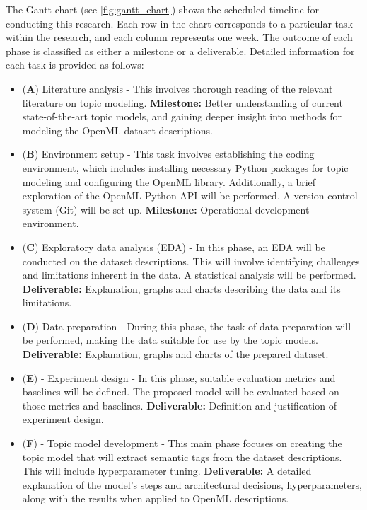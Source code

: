 \documentclass{article}
\begin{document}
The Gantt chart (see \cref{fig:gantt_chart}) shows the scheduled timeline for conducting this research. Each row in the chart corresponds to a particular task within the research, and each column represents one week. The outcome of each phase is classified as either a milestone or a deliverable. Detailed information for each task is provided as follows:

\begin{itemize}
    \item (\textbf{A}) Literature analysis - This involves thorough reading of the relevant literature on topic modeling. \textbf{Milestone:} Better understanding of current state-of-the-art topic models, and gaining deeper insight into methods for modeling the OpenML dataset descriptions.

    \item (\textbf{B}) Environment setup - This task involves establishing the coding environment, which includes installing necessary Python packages for topic modeling and configuring the OpenML library. Additionally, a brief exploration of the OpenML Python API will be performed. A version control system (Git) will be set up. \textbf{Milestone:} Operational development environment.

    \item (\textbf{C}) Exploratory data analysis (EDA) - In this phase, an EDA will be conducted on the dataset descriptions. This will involve identifying challenges and limitations inherent in the data. A statistical analysis will be performed. \textbf{Deliverable:} Explanation, graphs and charts describing the data and its limitations.

    \item (\textbf{D}) Data preparation - During this phase, the task of data preparation will be performed, making the data suitable for use by the topic models. \textbf{Deliverable:} Explanation, graphs and charts of the prepared dataset.

    \item (\textbf{E}) - Experiment design - In this phase, suitable evaluation metrics and baselines will be defined. The proposed model will be evaluated based on those metrics and baselines. \textbf{Deliverable:} Definition and justification of experiment design.

    \item (\textbf{F}) - Topic model development - This main phase focuses on creating the topic model that will extract semantic tags from the dataset descriptions. This will include hyperparameter tuning. \textbf{Deliverable:} A detailed explanation of the model's steps and architectural decisions, hyperparameters, along with the results when applied to OpenML descriptions.


\end{itemize}
\end{document}
